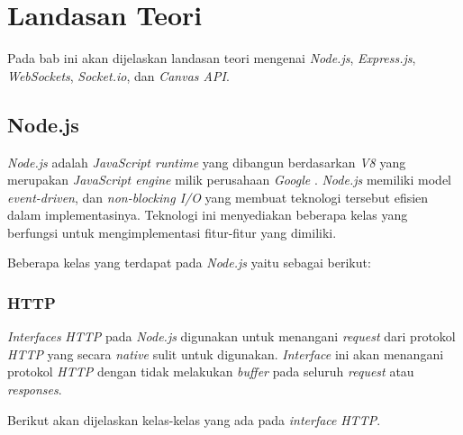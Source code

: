 \chapter{Landasan Teori}
\label{chap:teori}

Pada bab ini akan dijelaskan landasan teori mengenai \textit{Node.js}, \textit{Express.js}, \textit{WebSockets}, \textit{Socket.io}, dan \textit{Canvas API}.

\section{Node.js}


\label{sec:Node.js}

\textit{Node.js} adalah \textit{JavaScript runtime} yang dibangun berdasarkan \textit{V8} yang merupakan \textit{JavaScript engine} milik perusahaan \textit{Google} \cite{nodejs}. \textit{Node.js} memiliki model \textit{event-driven}, dan \textit{non-blocking I/O} yang membuat teknologi tersebut efisien dalam implementasinya. Teknologi ini menyediakan beberapa kelas yang berfungsi untuk mengimplementasi fitur-fitur yang dimiliki.

Beberapa kelas yang terdapat pada \textit{Node.js} yaitu sebagai berikut: 

\subsection{HTTP}
\textit{Interfaces} \textit{HTTP} pada \textit{Node.js} digunakan untuk menangani \textit{request} dari protokol \textit{HTTP} yang secara \textit{native} sulit untuk digunakan. \textit{Interface} ini akan menangani protokol \textit{HTTP} dengan tidak melakukan \textit{buffer} pada seluruh \textit{request} atau \textit{responses}.

Berikut akan dijelaskan kelas-kelas yang ada pada \textit{interface} \textit{HTTP}.

